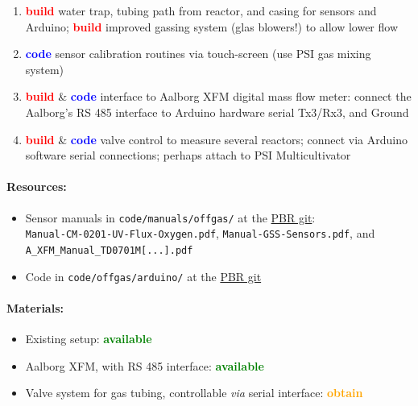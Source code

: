 \documentclass[12pt,a4paper]{scrartcl}
\newcommand{\git}[0]{\href{https://git.hhu.de/machne/pbr_hackathon_201503}{PBR git}}
\newcommand{\obtain}[0]{\textcolor{orange}{\textbf{obtain}}}
\newcommand{\avail}[0]{\textcolor{green}{\textbf{available}}}
\newcommand{\build}[0]{\textcolor{red}{\textbf{build}}}
\newcommand{\code}[0]{\textcolor{blue}{\textbf{code}}}
\begin{document}
\begin{enumerate}
\item \build{} water trap, tubing path from reactor, and casing for
  sensors and Arduino; \build{} improved gassing system (glas
  blowers!) to allow lower flow
\item \code{} sensor calibration routines via touch-screen (use PSI
  gas mixing system)
\item \build{} \& \code{} interface to Aalborg XFM digital mass flow
  meter: connect the Aalborg's RS 485 interface to Arduino hardware
  serial Tx3/Rx3, and Ground
\item \build{} \& \code{} valve control to measure several reactors;
  connect via Arduino software serial connections; perhaps attach to
  PSI Multicultivator
\end{enumerate}

\paragraph{Resources:}
\begin{itemize}
\item Sensor manuals in \texttt{code/manuals/offgas/} at the
  \git{}:\\
  \texttt{Manual-CM-0201-UV-Flux-Oxygen.pdf},
  \texttt{Manual-GSS-Sensors.pdf}, and\\
  \texttt{A\_XFM\_Manual\_TD0701M[...].pdf}
\item Code in  \texttt{code/offgas/arduino/} at the
  \git{}
\end{itemize}

\paragraph{Materials:}

\begin{itemize}
\item Existing setup: \avail{}
\item Aalborg XFM, with RS 485 interface: \avail{}
\item Valve system for gas tubing, controllable \textit{via} serial
  interface: \obtain{}
\end{itemize}
\end{document}
